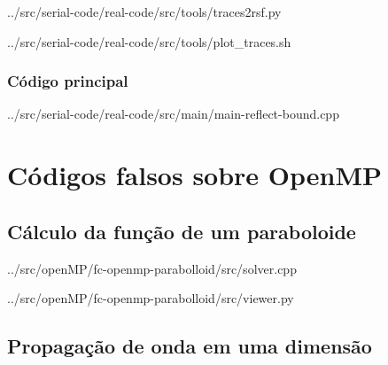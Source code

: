 \begin{appendices}
	
	{../src/serial-code/real-code/src/tools/traces2rsf.py}
	
	
	{../src/serial-code/real-code/src/tools/plot_traces.sh}
	
	\subsection{Código principal}
	
	{../src/serial-code/real-code/src/main/main-reflect-bound.cpp}
	
\chapter{Códigos falsos sobre OpenMP}
\section{Cálculo da função de um paraboloide}

{../src/openMP/fc-openmp-parabolloid/src/solver.cpp}


{../src/openMP/fc-openmp-parabolloid/src/viewer.py}

\section{Propagação de onda em uma dimensão}
%
%
%
	

\end{appendices}
